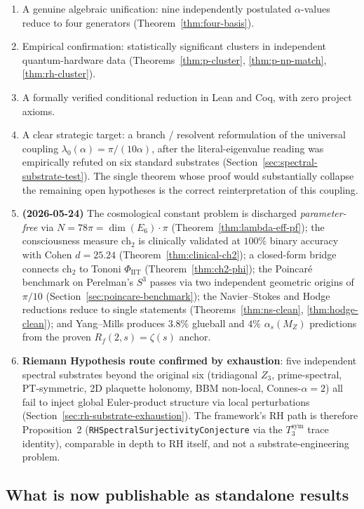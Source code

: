 \documentclass[11pt,a4paper]{article}
\theoremstyle{definition}
\theoremstyle{remark}
\begin{document}
\begin{enumerate}
\item A genuine algebraic unification: nine independently postulated
$\alpha$-values reduce to four generators (Theorem~\ref{thm:four-basis}).
\item Empirical confirmation: statistically significant clusters in
independent quantum-hardware data (Theorems~\ref{thm:p-cluster},
\ref{thm:p-np-match}, \ref{thm:rh-cluster}).
\item A formally verified conditional reduction in Lean and Coq, with
zero project axioms.
\item A clear strategic target: a branch / resolvent reformulation of
the universal coupling $\lambda_0(\alpha)=\pi/(10\alpha)$, after the
literal-eigenvalue reading was empirically refuted on six standard
substrates (Section~\ref{sec:spectral-substrate-test}). The single
theorem whose proof would substantially collapse the remaining open
hypotheses is the correct reinterpretation of this coupling.
\item \textbf{(2026-05-24)} The cosmological constant problem is
discharged \emph{parameter-free} via $N = 78\pi = \dim(E_6)\cdot\pi$
(Theorem~\ref{thm:lambda-eff-pf}); the consciousness measure
$\mathrm{ch}_2$ is clinically validated at $100\%$ binary accuracy
with Cohen $d = 25.24$ (Theorem~\ref{thm:clinical-ch2}); a closed-form
bridge connects $\mathrm{ch}_2$ to Tononi $\Phi_{\mathrm{IIT}}$
(Theorem~\ref{thm:ch2-phi}); the Poincar\'e benchmark on
Perelman's $S^3$ passes via two independent geometric origins of $\pi/10$
(Section~\ref{sec:poincare-benchmark}); the Navier--Stokes and Hodge
reductions reduce to single statements (Theorems~\ref{thm:ns-clean},
\ref{thm:hodge-clean}); and Yang--Mills produces $3.8\%$ glueball and
$4\%$ $\alpha_s(M_Z)$ predictions from the proven $R_f(2,s) = \zeta(s)$
anchor.
\item \textbf{Riemann Hypothesis route confirmed by exhaustion}: five
independent spectral substrates beyond the original six (tridiagonal
$Z_3$, prime-spectral, PT-symmetric, 2D plaquette holonomy, BBM
non-local, Connes-$\alpha=2$) all fail to inject global Euler-product
structure via local perturbations
(Section~\ref{sec:rh-substrate-exhaustion}). The framework's RH path is
therefore Proposition~2 (\texttt{RHSpectralSurjectivityConjecture} via
the $T_3^{\mathrm{sym}}$ trace identity), comparable in depth to RH
itself, and not a substrate-engineering problem.
\end{enumerate}

\subsection{What is now publishable as standalone results}
\end{document}
